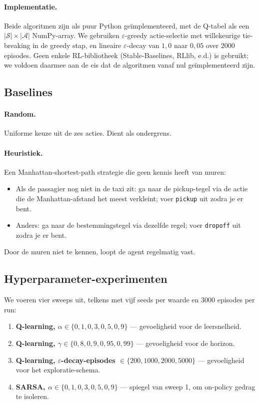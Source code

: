 \documentclass[11pt,a4paper]{article}
\begin{document}
\paragraph{Implementatie.} Beide algoritmen zijn als puur Python
ge\"implementeerd, met de Q-tabel als een
$|\mathcal{S}| \times |\mathcal{A}|$ NumPy-array. We gebruiken
$\varepsilon$-greedy actie-selectie met willekeurige tie-breaking in de
greedy stap, en lineaire $\varepsilon$-decay van $1{,}0$ naar $0{,}05$
over 2000 episodes. Geen enkele RL-bibliotheek (Stable-Baselines, RLlib,
e.d.) is gebruikt; we voldoen daarmee aan de eis dat de algoritmen
vanaf nul ge\"implementeerd zijn.

\subsection{Baselines}

\paragraph{Random.} Uniforme keuze uit de zes acties. Dient als
ondergrens.

\paragraph{Heuristiek.} Een Manhattan-shortest-path strategie die
geen kennis heeft van muren:
\begin{itemize}
  \item Als de passagier nog niet in de taxi zit: ga naar de pickup-tegel
        via de actie die de Manhattan-afstand het meest verkleint; voer
        \texttt{pickup} uit zodra je er bent.
  \item Anders: ga naar de bestemmingstegel via dezelfde regel; voer
        \texttt{dropoff} uit zodra je er bent.
\end{itemize}
Door de muren niet te kennen, loopt de agent regelmatig vast.

\subsection{Hyperparameter-experimenten}

We voeren vier sweeps uit, telkens met vijf seeds per waarde en
3000 episodes per run:

\begin{enumerate}
  \item \textbf{Q-learning, $\alpha \in \{0{,}1, 0{,}3, 0{,}5, 0{,}9\}$}
        --- gevoeligheid voor de leersnelheid.
  \item \textbf{Q-learning, $\gamma \in \{0{,}8, 0{,}9, 0{,}95, 0{,}99\}$}
        --- gevoeligheid voor de horizon.
  \item \textbf{Q-learning, $\varepsilon$-decay-episodes
        $\in \{200, 1000, 2000, 5000\}$}
        --- gevoeligheid voor het exploratie-schema.
  \item \textbf{SARSA, $\alpha \in \{0{,}1, 0{,}3, 0{,}5, 0{,}9\}$}
        --- spiegel van sweep 1, om on-policy gedrag te isoleren.
\end{enumerate}
\end{document}
